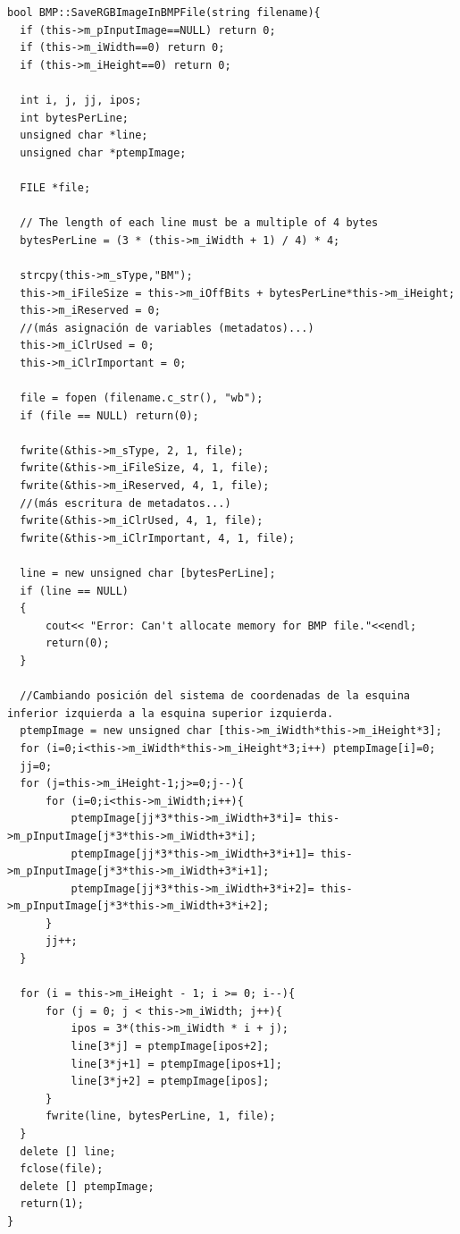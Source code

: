 \begin{verbatim}
bool BMP::SaveRGBImageInBMPFile(string filename){
  if (this->m_pInputImage==NULL) return 0;
  if (this->m_iWidth==0) return 0;
  if (this->m_iHeight==0) return 0;

  int i, j, jj, ipos;
  int bytesPerLine;
  unsigned char *line;
  unsigned char *ptempImage;

  FILE *file;

  // The length of each line must be a multiple of 4 bytes
  bytesPerLine = (3 * (this->m_iWidth + 1) / 4) * 4;

  strcpy(this->m_sType,"BM");
  this->m_iFileSize = this->m_iOffBits + bytesPerLine*this->m_iHeight;
  this->m_iReserved = 0;
  //(más asignación de variables (metadatos)...)
  this->m_iClrUsed = 0;
  this->m_iClrImportant = 0;

  file = fopen (filename.c_str(), "wb");
  if (file == NULL) return(0);

  fwrite(&this->m_sType, 2, 1, file);
  fwrite(&this->m_iFileSize, 4, 1, file);
  fwrite(&this->m_iReserved, 4, 1, file);
  //(más escritura de metadatos...)
  fwrite(&this->m_iClrUsed, 4, 1, file);
  fwrite(&this->m_iClrImportant, 4, 1, file);

  line = new unsigned char [bytesPerLine];
  if (line == NULL)
  {
      cout<< "Error: Can't allocate memory for BMP file."<<endl;
      return(0);
  }

  //Cambiando posición del sistema de coordenadas de la esquina inferior izquierda a la esquina superior izquierda.
  ptempImage = new unsigned char [this->m_iWidth*this->m_iHeight*3];
  for (i=0;i<this->m_iWidth*this->m_iHeight*3;i++) ptempImage[i]=0;
  jj=0;
  for (j=this->m_iHeight-1;j>=0;j--){
      for (i=0;i<this->m_iWidth;i++){
          ptempImage[jj*3*this->m_iWidth+3*i]= this->m_pInputImage[j*3*this->m_iWidth+3*i];
          ptempImage[jj*3*this->m_iWidth+3*i+1]= this->m_pInputImage[j*3*this->m_iWidth+3*i+1];
          ptempImage[jj*3*this->m_iWidth+3*i+2]= this->m_pInputImage[j*3*this->m_iWidth+3*i+2];
      }
      jj++;
  }

  for (i = this->m_iHeight - 1; i >= 0; i--){
      for (j = 0; j < this->m_iWidth; j++){
          ipos = 3*(this->m_iWidth * i + j);
          line[3*j] = ptempImage[ipos+2];
          line[3*j+1] = ptempImage[ipos+1];
          line[3*j+2] = ptempImage[ipos];
      }
      fwrite(line, bytesPerLine, 1, file);
  }
  delete [] line;
  fclose(file);
  delete [] ptempImage;
  return(1);
}

\end{verbatim}

